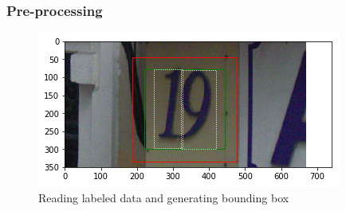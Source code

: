 \documentclass[11.5pt,aspectratio=1610,xcolor={usenames,dvipsnames,table}]{beamer}
\begin{document}
\begin{frame}

\frametitle{Pre-processing}

\begin{figure}[!h]
\includegraphics[width=\textwidth]{19.png}
\caption{Reading labeled data and generating bounding box}

\end{figure}
\end{frame}
\end{document}
